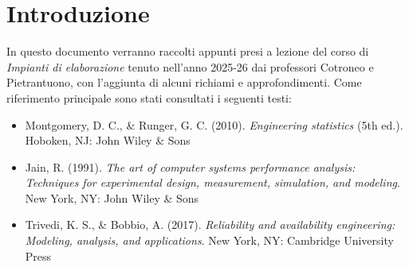 \chapter*{Introduzione}
In questo documento verranno raccolti appunti presi a lezione del corso di \textit{Impianti di elaborazione} tenuto nell'anno 2025-26 dai professori Cotroneo e Pietrantuono, con l'aggiunta di alcuni richiami e approfondimenti.
Come riferimento principale sono stati consultati i seguenti testi:
\begin{itemize}
  \item Montgomery, D. C., \& Runger, G. C. (2010). \textit{Engineering statistics} (5th ed.). Hoboken, NJ: John Wiley \& Sons
  \item Jain, R. (1991). \textit{The art of computer systems performance analysis: Techniques for experimental design, measurement, simulation, and modeling}. New York, NY: John Wiley \& Sons
  \item Trivedi, K. S., \& Bobbio, A. (2017). \textit{Reliability and availability engineering: Modeling, analysis, and applications}. New York, NY: Cambridge University Press
\end{itemize}


